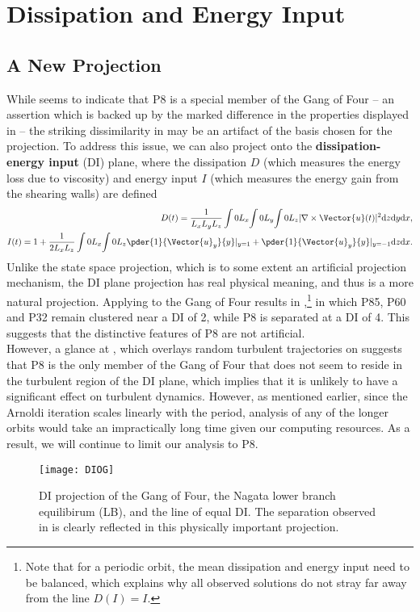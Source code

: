 \section{Dissipation and Energy Input} \label{sec:DI}
  
\subsection{A New Projection}
While  seems to indicate that P8 is a special member of the Gang of Four -- an assertion which is backed up by the marked difference in the properties displayed in  -- the striking dissimilarity in  may be an artifact of the basis chosen for the projection. To address this issue, we can also project onto the {\bf dissipation-energy input} (DI) plane, where the dissipation $D$ (which measures the energy loss due to viscosity) and energy input $I$ (which measures the energy gain from the shearing walls) are defined
\begin{align}
D(t) = \frac{1}{L_xL_yL_z}\int{0}{L_x}{\int{0}{L_y}{\int{0}{L_z}{|\nabla\times\Vector{u}(t)|^2}{\textrm{d}z}}{\textrm{d}y}}{\textrm{d}x},\label{eq:diss}\\
I(t)  = 1 + \frac{1}{2L_xL_z}\int{0}{L_x}{\int{0}{L_z}{\pder{1}{\Vector{u}_{y}}{y} |_{y=1}+\pder{1}{\Vector{u}_{y}}{y} |_{y=-1}}{\textrm{d}z}}{\textrm{d}x}.\label{eq:einp}
\end{align} 
Unlike the state space projection, which is to some extent an artificial projection mechanism, the DI plane projection has real physical meaning, and thus is a more natural projection. Applying  to the Gang of Four results in ,\footnote{Note that for a periodic orbit, the mean dissipation and energy input need to be balanced, which explains why all observed solutions do not stray far away from the line $D(I) = I$.} in which P85, P60 and P32 remain clustered near a DI of 2, while P8 is separated at a DI of 4. This suggests that the distinctive features of P8 are not artificial.\\

 However, a glance at , which overlays random turbulent trajectories on  suggests that P8 is the only member of the Gang of Four that does not seem to reside in the turbulent region of the DI plane, which implies that it is unlikely to have a significant effect on turbulent dynamics. However, as mentioned earlier, since the Arnoldi iteration scales linearly with the period, analysis of any of the longer orbits would take an impractically long time given our computing resources. As a result, we will continue to limit our analysis to P8.   
\begin{figure}[h]
\texttt{[image: DIOG]}
\caption{DI projection of the Gang of Four, the Nagata lower branch equilibirum (LB), and the line of equal DI. The separation observed in  is clearly reflected in this physically important projection.}\label{fig:DIGOF}
\end{figure}

